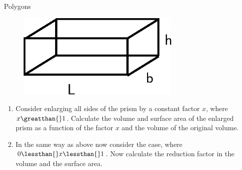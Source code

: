 \begin{exercises}{Polygons}
{\begin{mdframed}[linewidth=4, leftmargin=40, rightmargin=40]
\begin{exercise}
    \setcounter{subfigure}{0}


	\begin{figure}[H] %
    \begin{center}
    \label{m39357*id63644!!!underscore!!!media}\label{m39357*id63644!!!underscore!!!printimage}\includegraphics[width=300px]{col11306.imgs/m39357_MG10C14_009.png} %
        
      \vspace{2pt}
    \vspace{.1in}
    
    \end{center}

 \end{figure}   

    \addtocounter{footnote}{-0}
    
        \par 
        \label{m39357*id63651}\begin{enumerate}[noitemsep, label=\textbf{\arabic*}. ] 
            \leftskip=20pt\rightskip=\leftskip\label{m39357*uid21}\item Consider enlarging all sides of the prism by a constant factor $x$, where $x\greatthan{}1$. Calculate the volume and surface area of the enlarged prism as a function of the factor $x$ and the volume of the original volume.
\label{m39357*uid22}\item In the same way as above now consider the case, where $0\lessthan{}x\lessthan{}1$. Now calculate the reduction factor in the volume and the surface area.
\end{enumerate}
        

\end{exercise}
\end{mdframed}}
\end{exercises}
